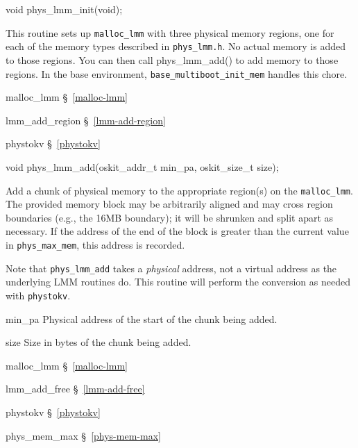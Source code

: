\label{phys-lmm-init}
\begin{apisyn}

	\funcproto void phys_lmm_init(void);
\end{apisyn}
\begin{apidesc}
	This routine sets up {\tt malloc_lmm} with three physical
	memory regions, one for each of the memory types described in
	{\tt phys_lmm.h}.
	No actual memory is added to those regions.
	You can then call phys_lmm_add() to add memory to those regions.
	In the base environment, {\tt base_multiboot_init_mem} handles
	this chore.
\end{apidesc}
\begin{apidep}
	\item[malloc_lmm]	\S~\ref{malloc-lmm}
	\item[lmm_add_region]	\S~\ref{lmm-add-region}
	\item[phystokv]		\S~\ref{phystokv}
\end{apidep}

\label{phys-lmm-add}
\begin{apisyn}

	\funcproto void phys_lmm_add(oskit_addr_t min_pa, oskit_size_t size);
\end{apisyn}
\begin{apidesc}
	Add a chunk of physical memory to the appropriate region(s)
	on the {\tt malloc_lmm}.
	The provided memory block may be arbitrarily aligned
	and may cross region boundaries (e.g., the 16MB boundary);
	it will be shrunken and split apart as necessary.
	If the address of the end of the block is greater than the current
	value in {\tt phys_max_mem}, this address is recorded.

	Note that {\tt phys_lmm_add} takes a \emph{physical} address,
	not a virtual address as the underlying LMM routines do.
	This routine will perform the conversion as needed with {\tt phystokv}.
\end{apidesc}
\begin{apiparm}
	\item[min_pa]
		Physical address of the start of the chunk being added.
	\item[size]
		Size in bytes of the chunk being added.
\end{apiparm}
\begin{apidep}
	\item[malloc_lmm]	\S~\ref{malloc-lmm}
	\item[lmm_add_free]	\S~\ref{lmm-add-free}
	\item[phystokv]		\S~\ref{phystokv}
	\item[phys_mem_max]	\S~\ref{phys-mem-max}
\end{apidep}


